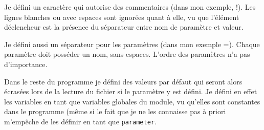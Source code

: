 \documentclass[a4paper,twoside]{article}
\begin{document}
Je défini un caractère qui autorise des commentaires (dans mon exemple, \og !\fg). Les lignes blanches ou avec espaces sont ignorées quant à elle, vu que l'élément déclencheur est la présence du séparateur entre nom de paramètre et valeur. 

Je défini aussi un séparateur pour les paramètres (dans mon exemple \og =\fg). Chaque paramètre doit posséder un nom, sans espaces. L'ordre des paramètres n'a pas d'importance. 

\begin{remarque}
Dans le reste du programme je défini des valeurs par défaut qui seront alors écrasées lors de la lecture du fichier si le paramètre y est défini. Je défini en effet les variables en tant que variables globales du module, vu qu'elles sont constantes dans le programme (même si le fait que je ne les connaisse pas à priori m'empêche de les définir en tant que \texttt{parameter}.
\end{remarque}
\end{document}
